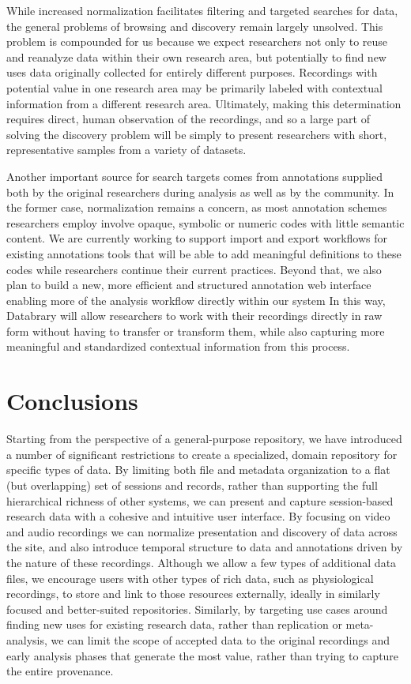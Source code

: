 \documentclass{sig-alternate}
\begin{document}
While increased normalization facilitates filtering and targeted searches for data, the general problems of browsing and discovery remain largely unsolved.
This problem is compounded for us because we expect researchers not only to reuse and reanalyze data within their own research area, but potentially to find new uses data originally collected for entirely different purposes.
Recordings with potential value in one research area may be primarily labeled with contextual information from a different research area.
Ultimately, making this determination requires direct, human observation of the recordings, and so a large part of solving the discovery problem will be simply to present researchers with short, representative samples from a variety of datasets.

Another important source for search targets comes from annotations supplied both by the original researchers during analysis as well as by the community.
In the former case, normalization remains a concern, as most annotation schemes researchers employ involve opaque, symbolic or numeric codes with little semantic content.
We are currently working to support import and export workflows for existing annotations tools that will be able to add meaningful definitions to these codes while researchers continue their current practices.
Beyond that, we also plan to build a new, more efficient and structured annotation web interface enabling more of the analysis workflow directly within our system
In this way, Databrary will allow researchers to work with their recordings directly in raw form without having to transfer or transform them, while also capturing more meaningful and standardized contextual information from this process.

\section{Conclusions}

Starting from the perspective of a general-purpose repository, we have introduced a number of significant restrictions to create a specialized, domain repository for specific types of data.
By limiting both file and metadata organization to a flat (but overlapping) set of sessions and records, rather than supporting the full hierarchical richness of other systems, we can present and capture session-based research data with a cohesive and intuitive user interface.
By focusing on video and audio recordings we can normalize presentation and discovery of data across the site, and also introduce temporal structure to data and annotations driven by the nature of these recordings.
Although we allow a few types of additional data files, we encourage users with other types of rich data, such as physiological recordings, to store and link to those resources externally, ideally in similarly focused and better-suited repositories.
Similarly, by targeting use cases around finding new uses for existing research data, rather than replication or meta-analysis, we can limit the scope of accepted data to the original recordings and early analysis phases that generate the most value, rather than trying to capture the entire provenance.
\end{document}
